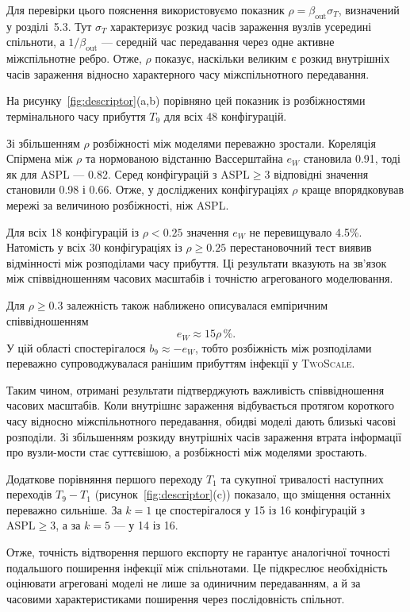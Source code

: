 \documentclass[a4paper,fleqn]{cas-sc}
\newcommand{\TS}{\textup{\textsc{TwoScale}}}
\newcommand{\eW}{e_{W}}
\begin{document}
Для перевірки цього пояснення
використовуємо показник
$\rho=\beta_{\mathrm{out}}\sigma_T$,
визначений у розділі~5.3.
Тут $\sigma_T$ характеризує
розкид часів зараження вузлів
усередині спільноти, а
$1/\beta_{\mathrm{out}}$ ---
середній час передавання через
одне активне міжспільнотне ребро.
Отже, $\rho$ показує, наскільки
великим є розкид внутрішніх
часів зараження відносно
характерного часу міжспільнотного
передавання.

На рисунку~\ref{fig:descriptor}(a,b)
порівняно цей показник із розбіжностями
термінального часу прибуття $T_9$
для всіх 48 конфігурацій.

Зі збільшенням $\rho$ розбіжності
між моделями переважно зростали.
Кореляція Спірмена між $\rho$
та нормованою відстанню Вассерштайна
$\eW$ становила 0.91, тоді як
для ASPL --- 0.82.
Серед конфігурацій з
$\mathrm{ASPL}\geq3$ відповідні
значення становили 0.98 і 0.66.
Отже, у досліджених конфігураціях
$\rho$ краще впорядковував мережі
за величиною розбіжності, ніж ASPL.

Для всіх 18 конфігурацій
із $\rho<0.25$ значення $\eW$
не перевищувало 4.5\%.
Натомість у всіх 30 конфігураціях
із $\rho\geq0.25$ перестановочний
тест виявив відмінності між
розподілами часу прибуття.
Ці результати вказують на
зв'язок між співвідношенням
часових масштабів і точністю
агрегованого моделювання.

Для $\rho\geq0.3$ залежність
також наближено описувалася
емпіричним співвідношенням
\begin{equation}
\eW \approx 15\rho\,\%.
\end{equation}
У цій області спостерігалося
$b_9\approx-\eW$, тобто
розбіжність між розподілами
переважно супроводжувалася
ранішим прибуттям інфекції
у \TS{}.

Таким чином, отримані результати
підтверджують важливість
співвідношення часових масштабів.
Коли внутрішнє зараження
відбувається протягом короткого
часу відносно міжспільнотного
передавання, обидві моделі
дають близькі часові розподіли.
Зі збільшенням розкиду
внутрішніх часів зараження
втрата інформації про вузли-мости
стає суттєвішою, а розбіжності
між моделями зростають.







Додаткове порівняння першого переходу
$T_1$ та сукупної тривалості наступних
переходів $T_9-T_1$
(рисунок~\ref{fig:descriptor}(c))
показало, що зміщення останніх
переважно сильніше.
За $k=1$ це спостерігалося
у 15 із 16 конфігурацій з
$\mathrm{ASPL}\geq3$, а за $k=5$
--- у 14 із 16.

Отже, точність відтворення першого
експорту не гарантує аналогічної
точності подальшого поширення
інфекції між спільнотами.
Це підкреслює необхідність
оцінювати агреговані моделі
не лише за одиничним передаванням,
а й за часовими характеристиками
поширення через послідовність
спільнот.




\clearpage



\end{document}
